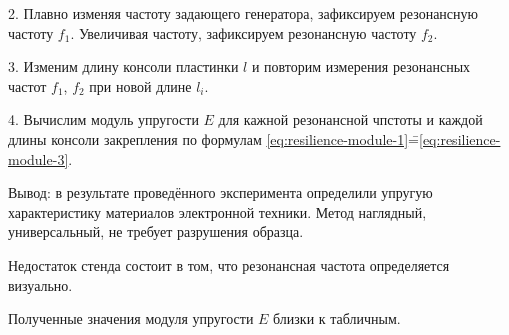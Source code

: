 2. Плавно изменяя частоту задающего генератора, зафиксируем резонансную частоту $f_1$.
Увеличивая частоту, зафиксируем резонансную частоту $f_2$.

3. Изменим длину консоли пластинки $l$ и повторим измерения резонансных частот $f_1$, $f_2$ при новой длине $l_i$.

4. Вычислим модуль упругости $E$ для кажной резонансной чпстоты и каждой длины консоли закрепления по формулам \eqref{eq:resilience-module-1}\==\eqref{eq:resilience-module-3}.

Вывод: в результате проведённого эксперимента определили упругую характеристику материалов электронной техники.
Метод наглядный, универсальный, не требует разрушения образца.

Недостаток стенда состоит в том, что резонансная частота определяется визуально.

Полученные значения модуля упругости $E$ близки к табличным.

